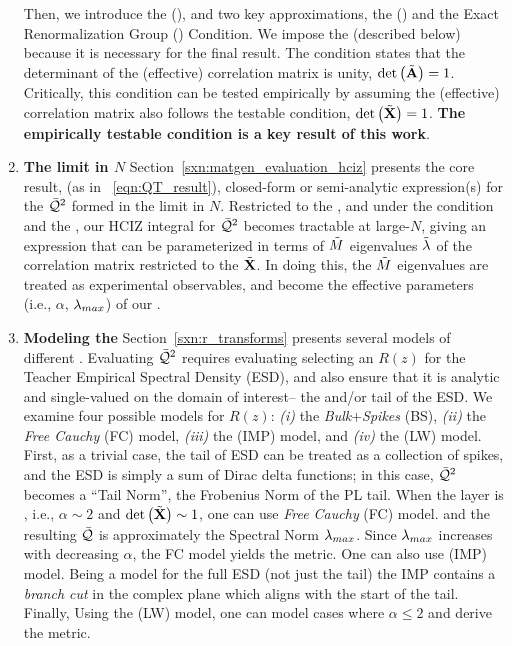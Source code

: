 \begin{enumerate}[label=5.\arabic*]
Then, we introduce the \EffectiveCorrelationSpace (\ECS), and two key approximations,
the \IndependentFluctuationApproximation (\IFA) and
the Exact Renormalization Group (\TRACELOG) Condition.
We impose the \IFA (described below) because it is necessary for the final result.
The \TRACELOG condition states that the determinant of the (effective) \Student correlation matrix is unity, $\mbox{}{\text{det}}\left(\tilde{\mathbf{A}}\right)=1$.
Critically, this condition can be tested empirically by assuming the (effective) \Teacher correlation matrix
also follows the testable \TRACELOG condition, $\mbox{}{\text{det}}\left(\tilde{\mathbf{X}}\right)=1$. \textbf{The empirically testable \ERG condition is a key result of this work}.


\item
\textbf{The \LargeN limit in $N$}
Section~\ref{sxn:matgen_evaluation_hciz} presents the core result,
(as in \EQN~\ref{eqn:QT_result}),
closed-form or semi-analytic expression(s) for the \LayerQualitySquared $\bar{\mathcal{Q}}^{2}$
formed in the \WideLayer \LargeN limit in $N$.
Restricted to the \ECS, and under the \TRACELOG condition and the \IFA, our
HCIZ integral for $\bar{\mathcal{Q}}^{2}$ becomes tractable at large-$N$, giving an expression that can be parameterized
in terms of $\tilde{M}$ eigenvalues $\tilde{\lambda}$ of the \Teacher correlation matrix 
restricted to the \ECS $\tilde{\mathbf{X}}$.
In doing this, the $\tilde{M}$ \Teacher eigenvalues are treated as experimental observables, and 
become the effective \SemiEmpirical parameters (i.e., $\alpha$, $\lambda_{max}$) of our \SETOL.

\item
\textbf{Modeling the \HeavyTailed \RTransform}
Section~\ref{sxn:r_transforms} presents several models of different \RTransforms.
Evaluating $\bar{\mathcal{Q}}^{2}$ requires evaluating selecting an \RTransform $R(z)$ for the Teacher Empirical Spectral Density (ESD),
and also ensure that it is analytic and single-valued on the domain of interest-- the \ECS and/or tail of the ESD.
We examine four possible models for $R(z)$: \emph{(i)} the \emph{Bulk$+$Spikes} (BS),
\emph{(ii)} the \emph{Free Cauchy} (FC) model, 
\emph{(iii)} the \emph{\InverseMP} (IMP) model, 
and \emph{(iv)} the  \LevyWigner (LW) model.
First, as a trivial case, the tail of ESD can be treated as a collection of spikes,
and the ESD is simply a sum of Dirac delta functions; in this case,
$\bar{\mathcal{Q}}^{2}$ becomes a ``Tail Norm'', the Frobenius Norm of the PL tail.
When the layer is \Ideal, i.e., $\alpha\sim 2$ and $\mbox{}{\text{det}}\left(\tilde{\mathbf{X}}\right)\sim 1$,
one can use  \emph{Free Cauchy} (FC) model.  and the resulting \LayerQuality $\bar{\mathcal{Q}}$
is approximately the Spectral Norm $\lambda_{max}$.
Since $\lambda_{max}$ increases with decreasing $\alpha$, the FC model yields the \HTSR \ALPHA metric.
One can also use  \emph{\InverseMP} (IMP) model. 
Being a model for the full \Teacher ESD (not just the tail) the IMP \RTransform contains a \emph{branch cut} in the complex plane
which aligns with the start of the \ECS \PowerLaw tail.
Finally, Using the \LevyWigner (LW) model, one can model cases where
$\alpha\le 2$ and derive the \HTSR \ALPHAHAT metric.
\end{enumerate}

